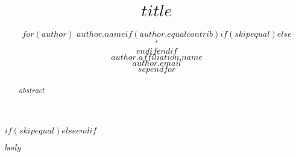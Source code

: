 \documentclass{article}
\title{$title$}
\author{%
$for(author)$%
$author.name$$if(author.equalcontrib)$$if(skipequal)$$else$$$^\ast$$$endif$$endif$\\
$author.affiliation.name$\\
\texttt{$author.email$}\\
$sep$\And$endfor$%
}
\begin{document}
\maketitle

$if(skipequal)$$else$$endif$

\begin{abstract}
$abstract$
\end{abstract}

$body$

\small


\end{document}
